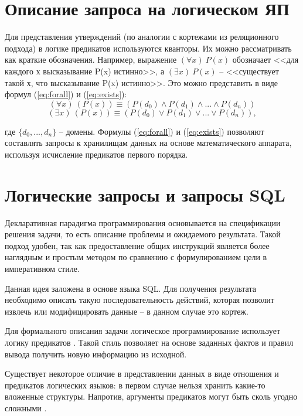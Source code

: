 \section{Описание запроса на логическом ЯП}
\vspace{-0.5cm}
Для представления утверждений (по аналогии с кортежами из реляционного подхода) в логике предикатов используются кванторы. Их можно рассматривать как краткие обозначения. Например, выражение $(\forall x)\ P(x)$ обозначает <<для каждого х высказывание P(x) истинно>>, а $(\exists x)\ P(x)$ -- <<существует такой х, что высказывание P(x) истинно>>. Это можно представить в виде формул (\ref{eq:forall}) и (\ref{eq:exists}):
\begin{equation}
	\label{eq:forall}
	(\forall x)\ (P(x)) \equiv (P(d_0) \land P(d_1) \land ... \land P(d_n))
\end{equation}
\begin{equation}
	(\exists x)\ (P(x)) \equiv (P(d_0) \lor P(d_1) \lor ... \lor P(d_n)),
	\label{eq:exists}
\end{equation}

где $\{d_0,...,d_n\}$ -- домены. Формулы (\ref{eq:forall}) и (\ref{eq:exists}) позволяют составлять запросы к хранилищам данных на основе математического аппарата, используя исчисление предикатов первого порядка.


\section{Логические запросы и запросы SQL}
\vspace{-0.5cm}
Декларативная парадигма программирования основывается на спецификации решения задачи, то есть описание проблемы и ожидаемого результата. Такой подход удобен, так как предоставление общих инструкций является более наглядным и простым методом по сравнению с формулированием цели в императивном стиле. 

Данная идея заложена в основе языка SQL. Для получения результата необходимо описать такую последовательность действий, которая позволит извлечь или модифицировать данные -- в данном случае это кортеж.

Для формального описания задачи логическое программирование использует логику предикатов \cite{logic_approach}. Такой стиль позволяет на основе заданных фактов и правил вывода получить новую информацию из исходной.

Существует некоторое отличие в представлении данных в виде отношения и предикатов логических языков: в первом случае нельзя хранить какие-то вложенные структуры. Напротив, аргументы предикатов могут быть сколь угодно сложными \cite{compare_relations_and_predicates_keeping}.

